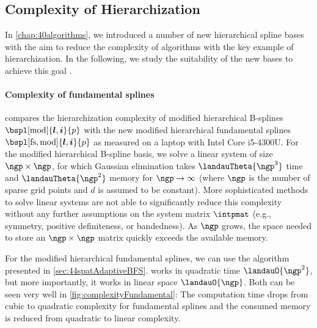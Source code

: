 \subsection{Complexity of Hierarchization}
\label{sec:543complexity}

In \cref{chap:40algorithms}, we introduced a number of new
hierarchical spline bases with the aim to reduce the complexity
of algorithms with the key example of hierarchization.
In the following, we study the suitability of the new bases
to achieve this goal \cite{Valentin18Fundamental}.

\paragraph{Complexity of fundamental splines}

 compares the hierarchization complexity of
modified hierarchical B-splines $\bspl[\modified]{\*l,\*i}{p}$ with the new
modified hierarchical fundamental splines $\bspl[\fs,\modified]{\*l,\*i}{p}$
as measured on a laptop with Intel Core i5-4300U.
For the modified hierarchical B-spline basis,
we solve a linear system of size $\ngp \times \ngp$,
for which Gaussian elimination takes
$\landauTheta{\ngp^3}$ time and $\landauTheta{\ngp^2}$ memory for
$\ngp \to \infty$ (where $\ngp$ is the number of sparse grid points and
$d$ is assumed to be constant).
More sophisticated methods to solve linear systems
are not able to significantly
reduce this complexity without any further assumptions on the system matrix
$\intpmat$ (e.g., symmetry, positive definiteness, or bandedness).
As $\ngp$ grows,
the space needed to store an $\ngp \times \ngp$ matrix quickly exceeds
the available memory.

For the modified hierarchical fundamental splines,
we can use the \bfs algorithm presented in \cref{sec:44spatAdaptiveBFS}.
\bfs works in quadratic time $\landauO{\ngp^2}$, but more importantly,
it works in linear space $\landauO{\ngp}$.
Both can be seen very well in \cref{fig:complexityFundamental}:
The computation time drops from cubic to quadratic complexity for fundamental splines
and the consumed memory is reduced from quadratic to linear complexity.


